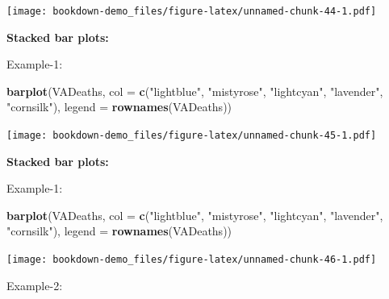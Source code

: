 \documentclass[]{book}
\newenvironment{Shaded}{\begin{snugshade}}{\end{snugshade}}
\newcommand{\KeywordTok}[1]{\textcolor[rgb]{0.13,0.29,0.53}{\textbf{#1}}}
\newcommand{\DataTypeTok}[1]{\textcolor[rgb]{0.13,0.29,0.53}{#1}}
\newcommand{\StringTok}[1]{\textcolor[rgb]{0.31,0.60,0.02}{#1}}
\newcommand{\CommentTok}[1]{\textcolor[rgb]{0.56,0.35,0.01}{\textit{#1}}}
\newcommand{\OperatorTok}[1]{\textcolor[rgb]{0.81,0.36,0.00}{\textbf{#1}}}
\newcommand{\NormalTok}[1]{#1}
\begin{document}
\texttt{[image: bookdown-demo\_files/figure-latex/unnamed-chunk-44-1.pdf]}

\textbf{Stacked bar plots:}

Example-1:

\begin{Shaded}
\begin{Highlighting}[]
\KeywordTok{barplot}\NormalTok{(VADeaths,}
         \DataTypeTok{col =} \KeywordTok{c}\NormalTok{(}\StringTok{"lightblue"}\NormalTok{, }\StringTok{"mistyrose"}\NormalTok{, }\StringTok{"lightcyan"}\NormalTok{, }
                 \StringTok{"lavender"}\NormalTok{, }\StringTok{"cornsilk"}\NormalTok{),}
        \DataTypeTok{legend =} \KeywordTok{rownames}\NormalTok{(VADeaths))}
\end{Highlighting}
\end{Shaded}

\texttt{[image: bookdown-demo\_files/figure-latex/unnamed-chunk-45-1.pdf]}

\textbf{Stacked bar plots:}

Example-1:

\begin{Shaded}
\begin{Highlighting}[]
\KeywordTok{barplot}\NormalTok{(VADeaths,}
         \DataTypeTok{col =} \KeywordTok{c}\NormalTok{(}\StringTok{"lightblue"}\NormalTok{, }\StringTok{"mistyrose"}\NormalTok{, }\StringTok{"lightcyan"}\NormalTok{, }
                 \StringTok{"lavender"}\NormalTok{, }\StringTok{"cornsilk"}\NormalTok{),}
        \DataTypeTok{legend =} \KeywordTok{rownames}\NormalTok{(VADeaths))}
\end{Highlighting}
\end{Shaded}

\texttt{[image: bookdown-demo\_files/figure-latex/unnamed-chunk-46-1.pdf]}

Example-2:

\begin{Shaded}
\end{Shaded}
\end{document}
